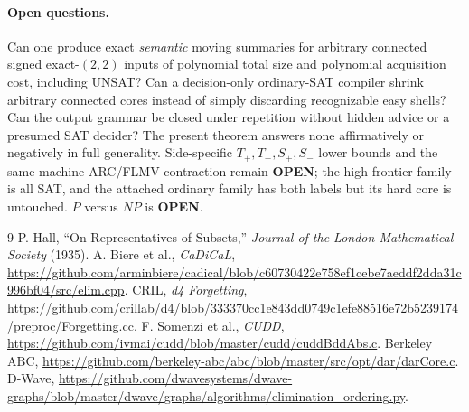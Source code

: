 \documentclass[11pt]{article}
\begin{document}
\paragraph{Open questions.} Can one produce exact \emph{semantic} moving summaries for arbitrary connected signed exact-$(2,2)$ inputs of polynomial total size and polynomial acquisition cost, including UNSAT? Can a decision-only ordinary-SAT compiler shrink arbitrary connected cores instead of simply discarding recognizable easy shells? Can the output grammar be closed under repetition without hidden advice or a presumed SAT decider? The present theorem answers none affirmatively or negatively in full generality. Side-specific $T_+,T_-,S_+,S_-$ lower bounds and the same-machine ARC/FLMV contraction remain \textbf{OPEN}; the high-frontier family is all SAT, and the attached ordinary family has both labels but its hard core is untouched. $P$ versus $NP$ is \textbf{OPEN}.

\begin{thebibliography}{9}
 P. Hall, ``On Representatives of Subsets,'' \emph{Journal of the London Mathematical Society} (1935).
 A. Biere et al., \emph{CaDiCaL}, \url{https://github.com/arminbiere/cadical/blob/c60730422e758ef1cebe7aeddf2dda31c996bf04/src/elim.cpp}.
 CRIL, \emph{d4 Forgetting}, \url{https://github.com/crillab/d4/blob/333370cc1e843dd0749c1efe88516e72b5239174/preproc/Forgetting.cc}.
 F. Somenzi et al., \emph{CUDD}, \url{https://github.com/ivmai/cudd/blob/master/cudd/cuddBddAbs.c}.
 Berkeley ABC, \url{https://github.com/berkeley-abc/abc/blob/master/src/opt/dar/darCore.c}.
 D-Wave, \url{https://github.com/dwavesystems/dwave-graphs/blob/master/dwave/graphs/algorithms/elimination_ordering.py}.
\end{thebibliography}
\end{document}
